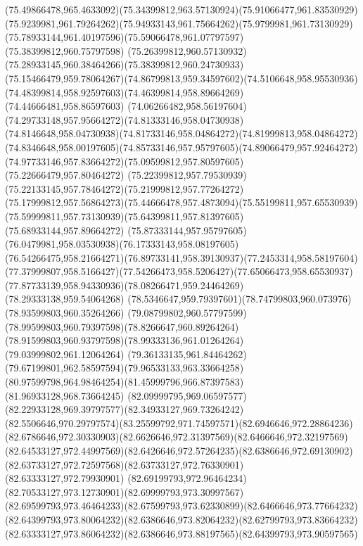 {{\curveto(75.49866478,965.4633092)(75.34399812,963.57130924)(75.91066477,961.83530929)
\curveto(75.9239981,961.79264262)(75.94933143,961.75664262)(75.9799981,961.73130929)
\curveto(75.78933144,961.40197596)(75.59066478,961.07797597)(75.38399812,960.75797598)
\curveto(75.26399812,960.57130932)(75.28933145,960.38464266)(75.38399812,960.24730933)
\curveto(75.15466479,959.78064267)(74.86799813,959.34597602)(74.5106648,958.95530936)
\curveto(74.48399814,958.92597603)(74.46399814,958.89664269)(74.44666481,958.86597603)
\curveto(74.06266482,958.56197604)(74.29733148,957.95664272)(74.81333146,958.04730938)
\curveto(74.8146648,958.04730938)(74.81733146,958.04864272)(74.81999813,958.04864272)
\curveto(74.8346648,958.00197605)(74.85733146,957.95797605)(74.89066479,957.92464272)
\curveto(74.97733146,957.83664272)(75.09599812,957.80597605)(75.22666479,957.80464272)
\curveto(75.22399812,957.79530939)(75.22133145,957.78464272)(75.21999812,957.77264272)
\curveto(75.17999812,957.56864273)(75.44666478,957.4873094)(75.55199811,957.65530939)
\curveto(75.59999811,957.73130939)(75.64399811,957.81397605)(75.68933144,957.89664272)
\curveto(75.87333144,957.95797605)(76.0479981,958.03530938)(76.17333143,958.08197605)
\curveto(76.54266475,958.21664271)(76.89733141,958.39130937)(77.2453314,958.58197604)
\curveto(77.37999807,958.5166427)(77.54266473,958.5206427)(77.65066473,958.65530937)
\curveto(77.87733139,958.94330936)(78.08266471,959.24464269)(78.29333138,959.54064268)
\curveto(78.5346647,959.79397601)(78.74799803,960.073976)(78.93599803,960.35264266)
\curveto(79.08799802,960.57797599)(78.99599803,960.79397598)(78.8266647,960.89264264)
\curveto(78.91599803,960.93797598)(78.99333136,961.01264264)(79.03999802,961.12064264)
\curveto(79.36133135,961.84464262)(79.67199801,962.58597594)(79.96533133,963.33664258)
\curveto(80.97599798,964.98464254)(81.45999796,966.87397583)(81.96933128,968.73664245)
\curveto(82.09999795,969.06597577)(82.22933128,969.39797577)(82.34933127,969.73264242)
\curveto(82.5506646,970.29797574)(83.25599792,971.74597571)(82.6946646,972.28864236)
\curveto(82.6786646,972.30330903)(82.6626646,972.31397569)(82.6466646,972.32197569)
\curveto(82.64533127,972.44997569)(82.6426646,972.57264235)(82.6386646,972.69130902)
\curveto(82.63733127,972.72597568)(82.63733127,972.76330901)(82.63333127,972.79930901)
\curveto(82.69199793,972.96464234)(82.70533127,973.12730901)(82.69999793,973.30997567)
\curveto(82.69599793,973.46464233)(82.67599793,973.62330899)(82.6466646,973.77664232)
\curveto(82.64399793,973.80064232)(82.6386646,973.82064232)(82.62799793,973.83664232)
\curveto(82.63333127,973.86064232)(82.6386646,973.88197565)(82.64399793,973.90597565)
}}
